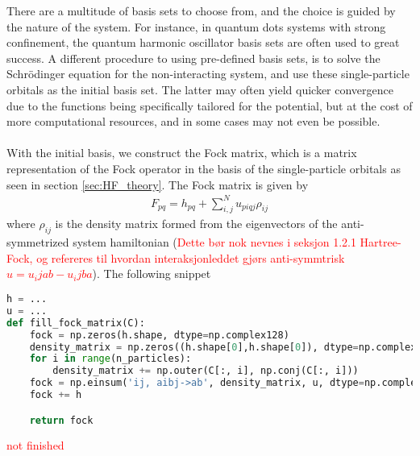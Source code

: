 \documentclass{subfiles}
\begin{document}
There are a multitude of basis sets to choose from, and the choice is guided by the nature of the system. For instance, in quantum dots systems with strong confinement, the quantum harmonic oscillator basis sets are often used to great success\cite{Yuan_2017}. A different procedure to using pre-defined basis sets, is to solve the Schrödinger equation for the non-interacting system, and use these single-particle orbitals as the initial basis set. The latter may often yield quicker convergence due to the functions being specifically tailored for the potential, but at the cost of more computational resources, and in some cases may not even be possible. 
\\
\\ With the initial basis, we construct the Fock matrix, which is a matrix representation of the Fock operator in the basis of the single-particle orbitals as seen in section \ref{sec:HF_theory}. The Fock matrix is given by
\begin{align}
    F_{pq} = h_{pq} + \sum_{i,j}^N u_{piqj}\rho_{ij} \label{eq:fock_matrix}
\end{align}
where $\rho_{ij}$ is the density matrix formed from the eigenvectors of the anti-symmetrized system hamiltonian (\textcolor{red}{Dette bør nok nevnes i seksjon 1.2.1 Hartree-Fock, og refereres til hvordan interaksjonleddet gjørs anti-symmtrisk $u = u_ijab - u_ijba$}). The following snippet 
\begin{lstlisting}[language=Python]
h = ...
u = ...
def fill_fock_matrix(C):
    fock = np.zeros(h.shape, dtype=np.complex128)
    density_matrix = np.zeros((h.shape[0],h.shape[0]), dtype=np.complex128)
    for i in range(n_particles):
        density_matrix += np.outer(C[:, i], np.conj(C[:, i]))
    fock = np.einsum('ij, aibj->ab', density_matrix, u, dtype=np.complex128)        # Compute the two-body operator potential
    fock += h                                                                       # Add the one-body operator hamiltonian

    return fock
\end{lstlisting}

\textcolor{red}{not finished}


\end{document}
